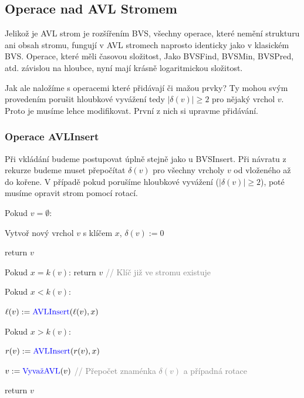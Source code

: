\subsection{Operace nad AVL Stromem}

Jelikož je AVL strom je rozšířením BVS, všechny operace, které nemění strukturu ani obsah stromu, fungují v AVL stromech naprosto identicky jako v klasickém BVS. Operace, které měli časovou složitost, Jako BVSFind, BVSMin, BVSPred, atd. závislou na hloubce, nyní mají krásně logaritmickou složitost. \medskip

\noindent
Jak ale naložíme s operacemi které přidávají či mažou prvky? Ty mohou svým provedením porušit hloubkové vyvážení tedy $|\delta(v)| \geq 2$ pro nějaký vrchol $v$. Proto je musíme lehce modifikovat. První z nich si upravme přidávání.

\subsubsection{Operace AVLInsert}

\noindent Při vkládání budeme postupovat úplně stejně jako u BVSInsert. Při návratu z rekurze budeme muset přepočítat $\delta(v)$ pro všechny vrcholy $v$ od vloženého až do kořene. V případě pokud porušíme hloubkové vyvážení ($|\delta(v)| \geq 2$), poté musíme opravit strom pomocí rotací.

\bigskip

\begin{pseudocode}
\item Pokud $v = \emptyset$:
\item \tab Vytvoř nový vrchol $v$ s klíčem $x$, $\delta(v) := 0$
\item \tab return $v$
\item Pokud $x = k(v)$: return $v$ \textcolor{gray}{// Klíč již ve stromu existuje}
\item Pokud $x < k(v)$:
\item \tab $\ell(v) := \text{\textcolor{blue}{AVLInsert}}(\ell(v), x)$
\item Pokud $x > k(v)$:
\item \tab $r(v) := \text{\textcolor{blue}{AVLInsert}}(r(v), x)$
\item $v := \text{\textcolor{blue}{VyvažAVL}}(v)$ \textcolor{gray}{// Přepočet znaménka $\delta(v)$ a případná rotace}
\item return $v$
\end{pseudocode}

